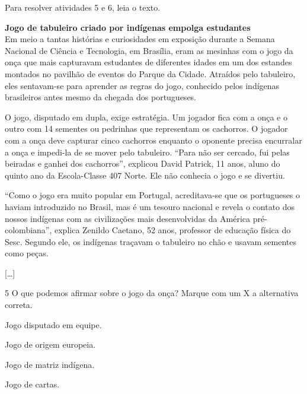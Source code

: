 Para resolver atividades 5 e 6, leia o texto.

\begin{myquote}
\textbf{Jogo de tabuleiro criado por indígenas empolga estudantes}\\
Em meio a tantas histórias e curiosidades em exposição durante a Semana
Nacional de Ciência e Tecnologia, em Brasília, eram as mesinhas com o
jogo da onça que mais capturavam estudantes de diferentes idades em um
dos estandes montados no pavilhão de eventos do Parque da Cidade.
Atraídos pelo tabuleiro, eles sentavam-se para aprender as regras do
jogo, conhecido pelos indígenas brasileiros antes mesmo da chegada dos
portugueses.

O jogo, disputado em dupla, exige estratégia. Um jogador fica com a onça
e o outro com 14 sementes ou pedrinhas que representam os cachorros. O
jogador com a onça deve capturar cinco cachorros enquanto o oponente
precisa encurralar a onça e impedi-la de se mover pelo tabuleiro. “Para
não ser cercado, fui pelas beiradas e ganhei dos cachorros”, explicou
David Patrick, 11 anos, aluno do quinto ano da Escola-Classe 407 Norte.
Ele não conhecia o jogo e se divertiu.

“Como o jogo era muito popular em Portugal, acreditava-se que os
portugueses o haviam introduzido no Brasil, mas é um tesouro nacional e
revela o contato dos nossos indígenas com as civilizações mais
desenvolvidas da América pré-colombiana”, explica Zenildo Caetano, 52
anos, professor de educação física do Sesc. Segundo ele, os indígenas
traçavam o tabuleiro no chão e usavam sementes como peças.

{[}\ldots{}{]}

\end{myquote}

\num{5} O que podemos afirmar sobre o jogo da onça? Marque com um X a alternativa correta.

\begin{boxlist}
 Jogo disputado em equipe.

 Jogo de origem europeia.

 Jogo de matriz indígena.

 Jogo de cartas.
\end{boxlist}

